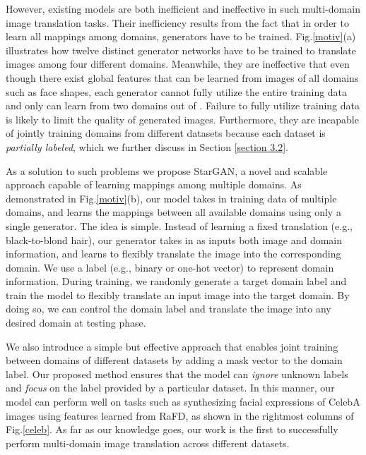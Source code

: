 \documentclass[10pt,twocolumn,letterpaper]{article}
\begin{document}
However, existing models are both inefficient and ineffective in such multi-domain image translation tasks. Their inefficiency results from the fact that in order to learn all mappings among  domains,  generators have to be trained. Fig.\thinspace\ref{motiv}\thinspace(a) illustrates how twelve distinct generator networks have to be trained to translate images among four different domains. Meanwhile, they are ineffective that even though there exist global features that can be learned from images of all domains such as face shapes, each generator cannot fully utilize the entire training data and only can learn from two domains out of . Failure to fully utilize training data is likely to limit the quality of generated images. Furthermore, they are incapable of jointly training domains from different datasets because each dataset is \textit{partially labeled}, which we further discuss in Section \ref{section 3.2}.



As a solution to such problems we propose StarGAN, a novel and scalable approach capable of learning mappings among multiple domains. As demonstrated in Fig.\thinspace\ref{motiv}\thinspace(b), our model takes in training data of multiple domains, and learns the mappings between all available domains using only a single generator. The idea is simple. Instead of learning a fixed translation (e.g., black-to-blond hair), our generator takes in as inputs both image and domain information, and learns to flexibly translate the image into the corresponding domain. We use a label (e.g., binary or one-hot vector) to represent domain information. During training, we randomly generate a target domain label and train the model to flexibly translate an input image into the target domain. By doing so, we can control the domain label and translate the image into any desired domain at testing phase. 

We also introduce a simple but effective approach that enables joint training between domains of different datasets by adding a mask vector to the domain label. Our proposed method ensures that the model can \textit{ignore} unknown labels and \textit{focus} on the label provided by a particular dataset. In this manner, our model can perform well on tasks such as synthesizing facial expressions of CelebA images using features learned from RaFD, as shown in the rightmost columns of Fig.\thinspace\ref{celeb}. As far as our knowledge goes, our work is the first to successfully perform multi-domain image translation across different datasets.
\end{document}
